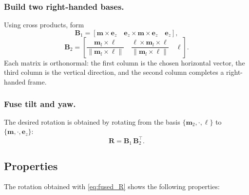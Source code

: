 \documentclass{IJCAS}
\begin{document}
\subsubsection{ Build two right-handed bases.}
Using cross products, form
\[
  \boldsymbol{B}_{1}
  =
  \left[
    \boldsymbol{m}\times\boldsymbol{e}_{z}\quad
    \boldsymbol{e}_{z}\times\boldsymbol{m}\times\boldsymbol{e}_{z}\quad
    \boldsymbol{e}_{z}
  \right],
\]
\[
  \boldsymbol{B}_{2}
  =
  \left[
    \frac{\boldsymbol{m}_{l}\times\boldsymbol{\ell}}
         {\|\boldsymbol{m}_{l}\times\boldsymbol{\ell}\|}\quad
    \frac{\boldsymbol{\ell}\times\boldsymbol{m}_{l}\times\boldsymbol{\ell}}
         {\|\boldsymbol{m}_{l}\times\boldsymbol{\ell}\|}\quad
    \boldsymbol{\ell}
  \right].
\]
Each matrix is orthonormal: the first column is the chosen horizontal
vector, the third column is the vertical direction, and the second
column completes a right-handed frame.

\subsubsection{ Fuse tilt and yaw.}
The desired rotation is obtained by rotating from the basis
$\{\boldsymbol{m}_{2},\cdot,\boldsymbol{\ell}\}$ to
$\{\boldsymbol{m},\cdot,\boldsymbol{e}_{z}\}$:
\begin{equation}
  \boldsymbol{R} = \boldsymbol{B}_{1}\,\boldsymbol{B}_{2}^{\top}.
  \label{eq:fused_R}
\end{equation}



\subsection{Properties}

The rotation obtained with \eqref{eq:fused_R} shows the following
properties:
\end{document}
